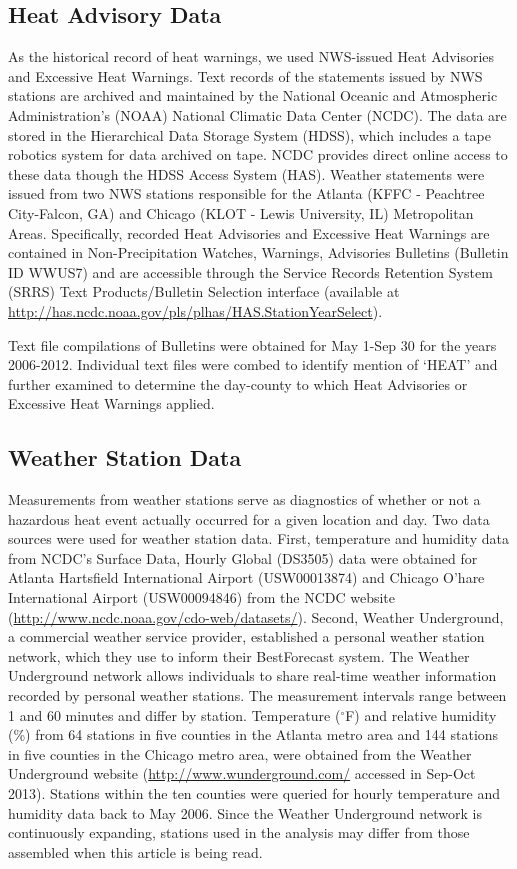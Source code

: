 \documentclass{ametsoc}
\begin{document}
\subsection{Heat Advisory Data}\label{subsec:NWSdata}
As the historical record of heat warnings, we used NWS-issued Heat Advisories and Excessive Heat Warnings. Text records of the statements issued by NWS stations are archived and maintained by the National Oceanic and Atmospheric Administration's (NOAA) National Climatic Data Center (NCDC). The data are stored in the Hierarchical Data Storage System (HDSS), which includes a tape robotics system for data archived on tape. NCDC provides direct online access to these data though the HDSS Access System (HAS). Weather statements were issued from two NWS stations responsible for the Atlanta (KFFC - Peachtree City-Falcon, GA) and Chicago (KLOT - Lewis University, IL) Metropolitan Areas. Specifically, recorded Heat Advisories and Excessive Heat Warnings are contained in Non-Precipitation Watches, Warnings, Advisories Bulletins (Bulletin ID WWUS7) and are accessible through the Service Records Retention System (SRRS) Text Products/Bulletin Selection interface (available at \url{http://has.ncdc.noaa.gov/pls/plhas/HAS.StationYearSelect}).

Text file compilations of Bulletins were obtained for May 1-Sep 30 for the years 2006-2012. Individual text files were combed to identify mention of `HEAT' and further examined to determine the day-county to which Heat Advisories or Excessive Heat Warnings applied. 

\subsection{Weather Station Data}\label{subsec:WUNDERdata}
Measurements from weather stations serve as diagnostics of whether or not a hazardous heat event actually occurred for a given location and day. Two data sources were used for weather station data. First, temperature and humidity data from NCDC's Surface Data, Hourly Global (DS3505) data were obtained for Atlanta Hartsfield International Airport (USW00013874) and Chicago O'hare International Airport (USW00094846) from the NCDC website (\url{http://www.ncdc.noaa.gov/cdo-web/datasets/}). Second, Weather Underground, a commercial weather service provider, established a personal weather station network, which they use to inform their BestForecast\textsuperscript{\textregistered} system. The Weather Underground network allows individuals to share real-time weather information recorded by personal weather stations. The measurement intervals range between 1 and 60 minutes and differ by station. Temperature ($^{\circ}$F) and relative humidity (\%) from 64 stations in five counties in the Atlanta metro area and 144 stations in five counties in the Chicago metro area, were obtained from the Weather Underground website (\url{http://www.wunderground.com/} accessed in Sep-Oct 2013). Stations within the ten counties were queried for hourly temperature and humidity data back to May 2006. Since the Weather Underground network is continuously expanding, stations used in the analysis may differ from those assembled when this article is being read. 
\end{document}
